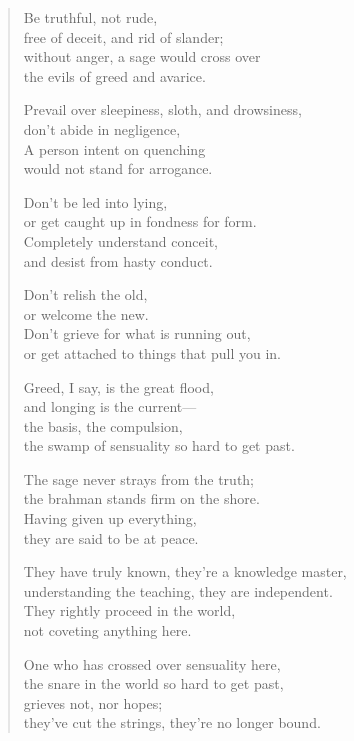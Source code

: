 \documentclass[12pt,openany]{book}%
\begin{document}
\begin{verse}
Be truthful, not rude, \\
free of deceit, and rid of slander; \\
without anger, a sage would cross over \\
the evils of greed and avarice. 

Prevail over sleepiness, sloth, and drowsiness, \\
don’t abide in negligence, \\
A person intent on quenching \\
would not stand for arrogance. 

Don’t be led into lying, \\
or get caught up in fondness for form. \\
Completely understand conceit, \\
and desist from hasty conduct. 

Don’t relish the old, \\
or welcome the new. \\
Don’t grieve for what is running out, \\
or get attached to things that pull you in. 

Greed, I say, is the great flood, \\
and longing is the current—\\
the basis, the compulsion, \\
the swamp of sensuality so hard to get past. 

The sage never strays from the truth; \\
the brahman stands firm on the shore. \\
Having given up everything, \\
they are said to be at peace. 

They have truly known, they’re a knowledge master, \\
understanding the teaching, they are independent. \\
They rightly proceed in the world, \\
not coveting anything here. 

One who has crossed over sensuality here, \\
the snare in the world so hard to get past, \\
grieves not, nor hopes; \\
they’ve cut the strings, they’re no longer bound. 


\end{verse}
\end{document}
